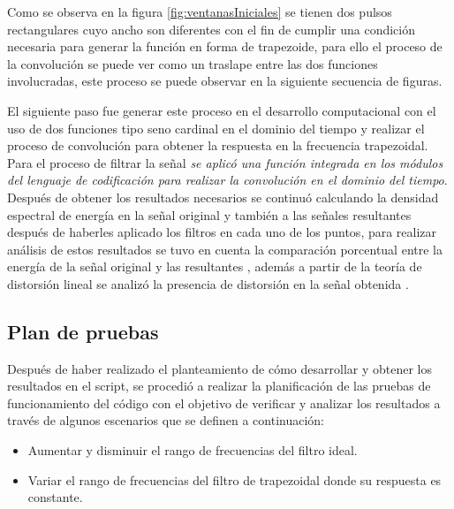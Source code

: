 Como se observa en la figura \ref{fig:ventanasIniciales} se tienen dos pulsos rectangulares cuyo ancho son diferentes con el fin de cumplir una condición necesaria para generar la función en forma de trapezoide, para ello el proceso de la convolución se puede ver como un traslape entre las dos funciones involucradas, este proceso se puede observar en la siguiente secuencia de figuras.

\vspace{-3mm}

\vspace{-9mm}

\vspace{-9mm}

\vspace{-5mm}

El siguiente paso fue generar este proceso en el desarrollo computacional con el uso de dos funciones tipo seno cardinal en el dominio del tiempo y realizar el proceso de convolución para obtener la respuesta en la frecuencia trapezoidal. Para el proceso de filtrar la señal \textit{se aplicó una función integrada en los módulos del lenguaje de codificación para realizar la convolución en el dominio del tiempo}. Después de obtener los resultados necesarios se continuó calculando la densidad espectral de energía en la señal original y también a las señales resultantes después de haberles aplicado los filtros en cada uno de los puntos, para realizar análisis de estos resultados se tuvo en cuenta la comparación porcentual entre la energía de la señal original y las resultantes \cite{densidad2021}, además a partir de la teoría de distorsión lineal se analizó la presencia de distorsión en la señal obtenida \cite{quiz2021}.

\subsection{Plan de pruebas}\label{planPruebas}
Después de haber realizado el planteamiento de cómo desarrollar y obtener los resultados en el script, se procedió a realizar la planificación de las pruebas de funcionamiento del código con el objetivo de verificar y analizar los resultados a través de algunos escenarios que se definen a continuación:

\begin{itemize}
	\item Aumentar y disminuir el rango de frecuencias del filtro ideal.
	\item Variar el rango de frecuencias del filtro de trapezoidal donde su respuesta es constante.
\end{itemize}

